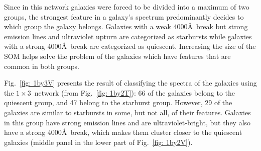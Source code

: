             Since in this network galaxies were forced to be divided into a maximum of two groups, the strongest feature in a galaxy's spectrum predominantly decides to which group the galaxy belongs.
            Galaxies with a weak 4000\AA~break but strong emission lines and ultraviolet upturn are categorized as starbursts while galaxies with a strong 4000\AA~break are categorized as quiescent.
            Increasing the size of the SOM helps solve the problem of the galaxies which have features that are common in both groups.
            
            Fig.~\ref{fig: 1by3V} presents the result of classifying the spectra of the galaxies using the $1\times3$~network (from Fig.~\ref{fig: 1by2T}): 66 of the galaxies belong to the quiescent group, and 47 belong to the starburst group. 
            However, 29 of the galaxies are similar to starbursts in some, but not all, of their features. 
            Galaxies in this group have strong emission lines and are ultraviolet-bright, but they also have a strong 4000\AA~break, which makes them cluster closer to the quiescent galaxies (middle panel in the lower part of Fig.~\ref{fig: 1by2V}).

